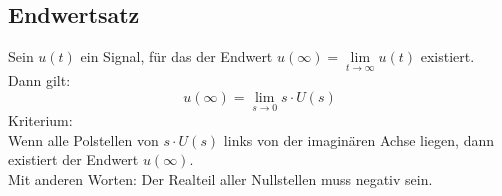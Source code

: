 \subsection{Endwertsatz}
Sein $u(t)$ ein Signal, für das der Endwert 
$u(\infty) = \lim\limits_{t \to \infty} u(t)$ existiert. \\
Dann gilt: 
\[ u(\infty) = \lim\limits_{s \to 0} s \cdot U(s) \]
Kriterium: \\
Wenn alle Polstellen von $s \cdot U(s)$ links von der imaginären Achse liegen, 
dann existiert der Endwert $u(\infty)$. \\
Mit anderen Worten: Der Realteil aller Nullstellen muss negativ sein. 
